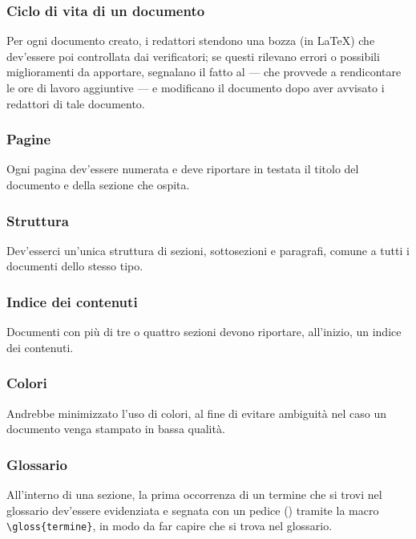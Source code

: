 \subsubsection{Ciclo di vita di un documento} Per ogni documento creato, i redattori stendono una bozza (in \LaTeX) che dev'essere poi controllata dai verificatori; se questi rilevano errori o possibili miglioramenti da apportare, segnalano il fatto al  --- che provvede a rendicontare le ore di lavoro aggiuntive --- e modificano il documento dopo aver avvisato i redattori di tale documento.

\subsubsection{Pagine} Ogni pagina dev'essere numerata e deve riportare in testata il titolo del documento e della sezione che ospita. %

\subsubsection{Struttura} Dev'esserci un'unica struttura di sezioni, sottosezioni e paragrafi, comune a tutti i documenti dello stesso tipo.

\subsubsection{Indice dei contenuti} Documenti con più di tre o quattro sezioni devono riportare, all'inizio, un indice dei contenuti.

\subsubsection{Colori} Andrebbe minimizzato l'uso di colori, al fine di evitare ambiguità nel caso un documento venga stampato in bassa qualità.

\subsubsection{Glossario} All'interno di una sezione, la prima occorrenza di un termine che si trovi nel glossario dev'essere evidenziata e segnata con un pedice () tramite la macro \texttt{\textbackslash gloss\{termine\}}, in modo da far capire che si trova nel glossario.


